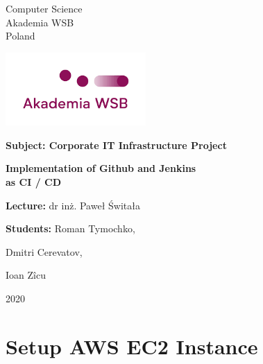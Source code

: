 \documentclass[12pt,a4paper,twoside]{article}
\begin{document}
\fontsize{14pt}{14pt}\selectfont
\begin{titlepage}
 \begin{center}
       Computer Science\\
       Akademia WSB\\
       Poland\\

      \vspace*{2cm}

      \includegraphics[width=0.4\textwidth]{images-aws/university}

       \vspace*{3cm}
      
       \textbf{Subject: Corporate IT Infrastructure Project}
 
       \begin{center}
	\Large\textbf{Implementation of Github and Jenkins \\ as CI / CD}\\
       \end{center}

       \vspace{0.5cm}
        
            
       \vspace{1.5cm}


       \mbox{}\hfill \textbf{Lecture:}  dr inż. Paweł Świtała

       {\raggedleft \textbf{Students:} Roman Tymochko, \par}
       {\raggedleft Dmitri Cerevatov,       \par}
       {\raggedleft Ioan Zîcu                    \par}


       \vfill
            

       \vspace{2cm}
     
       2020
            
   \end{center}
\end{titlepage}

\newpage

\fontsize{12pt}{12pt}\selectfont


\section{Setup AWS EC2 Instance}
\end{document}

